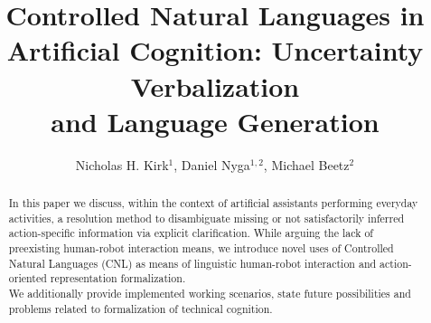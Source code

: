 \documentclass[oribibl]{llncs}
\begin{document}
%
\frontmatter          %
%
\pagestyle{headings}  %
\title{Controlled Natural Languages in\\ Artificial Cognition: Uncertainty Verbalization\\and Language Generation}
%
\author{Nicholas H. Kirk$^1$, Daniel Nyga$^{1,2}$, Michael Beetz$^2$}
%
%
%
\maketitle              %
\begin{abstract}

In this paper we discuss, within the context of artificial assistants performing everyday activities, a resolution method to disambiguate missing or not satisfactorily inferred action-specific information via explicit clarification.
While arguing the lack of preexisting human-robot interaction means, 
we introduce novel uses of Controlled Natural Languages (CNL)
as means of linguistic human-robot interaction and action-oriented representation formalization.\\
We additionally provide implemented working scenarios, 
state future possibilities and problems related to formalization of technical cognition.

 \end{abstract}
\end{document}
